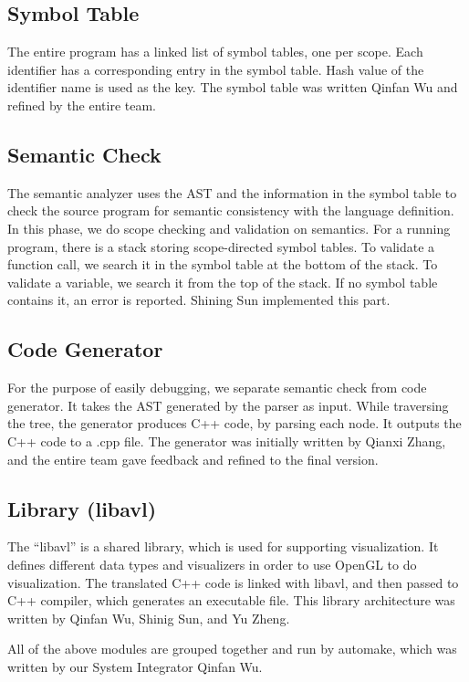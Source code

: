 \subsection{Symbol Table}
The entire program has a linked list of symbol tables, one per scope. Each identifier has a
corresponding entry in the symbol table. Hash value of the identifier name is used as the key. The
symbol table was written Qinfan Wu and refined by the entire team.

\subsection{Semantic Check}
The semantic analyzer uses the AST and the information in the symbol table to check the source
program for semantic consistency with the language definition. In this phase, we do scope checking
and validation on semantics. For a running program, there is a stack storing scope-directed symbol
tables. To validate a function call, we search it in the symbol table at the bottom of the stack. To
validate a variable, we search it from the top of the stack. If no symbol table contains it, an
error is reported. Shining Sun implemented this part.

\subsection{Code Generator}
For the purpose of easily debugging, we separate semantic check from code generator. It takes the
AST generated by the parser as input. While traversing the tree, the generator produces C++ code, by
parsing each node. It outputs the C++ code to a .cpp file. The generator was initially written by
Qianxi Zhang, and the entire team gave feedback and refined to the final version.

\subsection{Library (libavl)}
The “libavl” is a shared library, which is used for supporting visualization. It defines different
data types and visualizers in order to use OpenGL to do visualization. The translated C++ code is
linked with libavl, and then passed to C++ compiler, which generates an executable file. This
library architecture was written by Qinfan Wu, Shinig Sun, and Yu Zheng.

All of the above modules are grouped together and run by automake, which was written by our System
Integrator Qinfan Wu.
